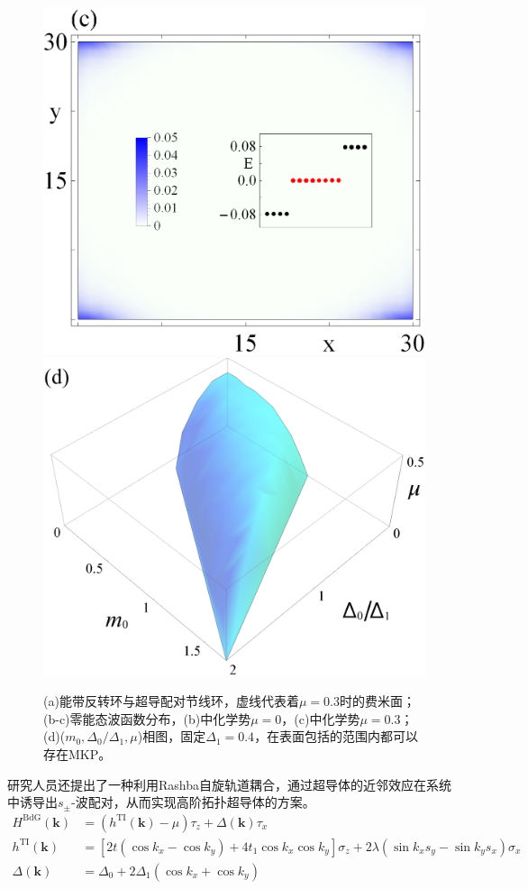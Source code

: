 \begin{figure}[h]
\includegraphics[scale=0.45]{pic/fig12c}
\includegraphics[scale=0.09]{pic/fig12d}
\caption{(a)能带反转环与超导配对节线环，虚线代表着$\mu=0.3$时的费米面；(b-c)零能态波函数分布，(b)中化学势$\mu=0$，(c)中化学势$\mu=0.3$；(d)($m_0,\Delta_0/\Delta_1,\mu$)相图，固定$\Delta_1=0.4$，在表面包括的范围内都可以存在MKP\cite{re28}。}\label{fig11}
\end{figure}

 研究人员还提出了一种利用Rashba自旋轨道耦合，通过超导体的近邻效应在系统中诱导出$s_\pm$-波配对，从而实现高阶拓扑超导体的方案\cite{re27}。
\begin{equation}
\begin{aligned}
H^{\mathrm{BdG}}(\mathbf{k})&=(h^{\mathrm{TI}}(\mathbf{k})-\mu)\tau_z+\Delta(\mathbf{k})\tau_x\\
h^{\mathrm{TI}}(\mathbf{k})&=\left[2t(\cos k_x-\cos k_y)+4t_1\cos k_x\cos k_y\right]\sigma_z+2\lambda(\sin k_xs_y-\sin k_ys_x)\sigma_x\\
\Delta(\mathbf{k})&=\Delta_0+2\Delta_1(\cos k_x+\cos k_y)\label{hosc2}
\end{aligned}
\end{equation}

